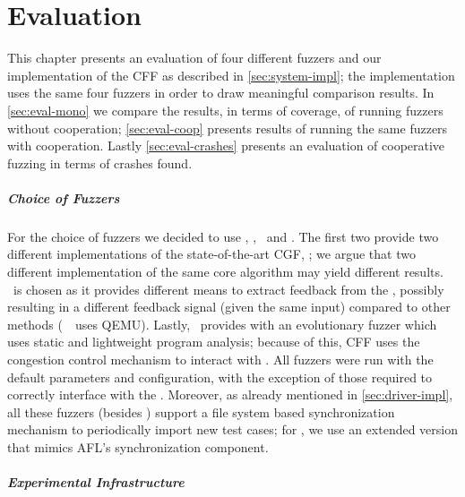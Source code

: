 \chapter{Evaluation}
\label{chap:evaluation}


This chapter presents an evaluation of four different fuzzers and our
implementation of the \acf{CFF} as described in \autoref{sec:system-impl}; the
implementation uses the same four fuzzers in order to draw meaningful comparison
results. In \autoref{sec:eval-mono} we compare the results, in terms of
coverage, of running fuzzers without cooperation; \autoref{sec:eval-coop}
presents results of running the same fuzzers with cooperation. Lastly
\autoref{sec:eval-crashes} presents an evaluation of cooperative fuzzing in
terms of crashes found.

\paragraph{Choice of Fuzzers}

For the choice of fuzzers we decided to use \aflfast, \fairfuzz, \honggfuzz\ and
\vuzzer. The first two provide two different implementations of the
state-of-the-art \ac{CGF}, \afl; we argue that two different implementation of
the same core algorithm may yield different results. \honggfuzz\ is chosen as it
provides different means to extract feedback from the \sut, possibly resulting
in a different feedback signal (given the same input) compared to other methods
(\eg\ \afl\ uses QEMU). Lastly, \vuzzer\ provides with an evolutionary fuzzer
which uses static and lightweight program analysis; because of this, \ac{CFF}
uses the congestion control mechanism to interact with \vuzzer. All fuzzers were
run with the default parameters and configuration, with the exception of those
required to correctly interface with the \sut.  Moreover, as already mentioned
in \autoref{sec:driver-impl}, all these fuzzers (besides \honggfuzz) support a
file system based synchronization mechanism to periodically import new test
cases; for \honggfuzz, we use an extended version that mimics AFL's
synchronization component.

\paragraph{Experimental Infrastructure}

